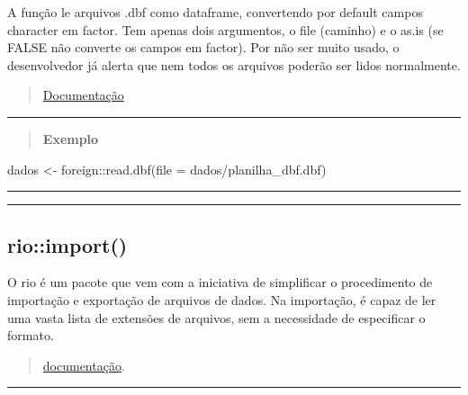 \documentclass[
]{book}
\newenvironment{Shaded}{\begin{snugshade}}{\end{snugshade}}
\newcommand{\AttributeTok}[1]{\textcolor[rgb]{0.77,0.63,0.00}{#1}}
\newcommand{\FunctionTok}[1]{\textcolor[rgb]{0.00,0.00,0.00}{#1}}
\newcommand{\NormalTok}[1]{#1}
\newcommand{\OtherTok}[1]{\textcolor[rgb]{0.56,0.35,0.01}{#1}}
\newcommand{\SpecialCharTok}[1]{\textcolor[rgb]{0.00,0.00,0.00}{#1}}
\newcommand{\StringTok}[1]{\textcolor[rgb]{0.31,0.60,0.02}{#1}}
\theoremstyle{definition}
\theoremstyle{definition}
\theoremstyle{definition}
\theoremstyle{definition}
\theoremstyle{remark}
\begin{document}
A função le arquivos .dbf como dataframe, convertendo por default campos character em factor. Tem apenas dois argumentos, o file (caminho) e o as.is (se FALSE não converte os campos em factor). Por não ser muito usado, o desenvolvedor já alerta que nem todos os arquivos poderão ser lidos normalmente.

\begin{quote}
\href{https://www.rdocumentation.org/packages/foreign/versions/0.8-82/topics/read.dbf}{Documentação}
\end{quote}

\begin{center}\rule{0.5\linewidth}{0.5pt}\end{center}

\begin{quote}
\textbf{Exemplo}
\end{quote}

\begin{Shaded}
\begin{Highlighting}[]
\NormalTok{dados }\OtherTok{\textless{}{-}}\NormalTok{ foreign}\SpecialCharTok{::}\FunctionTok{read.dbf}\NormalTok{(}\AttributeTok{file =} \StringTok{\textquotesingle{}dados/planilha\_dbf.dbf\textquotesingle{}}\NormalTok{)}
\end{Highlighting}
\end{Shaded}

\begin{center}\rule{0.5\linewidth}{0.5pt}\end{center}

\begin{center}\rule{0.5\linewidth}{0.5pt}\end{center}

\hypertarget{rioimport}{%
\subsection{rio::import()}\label{rioimport}}

O rio é um pacote que vem com a iniciativa de simplificar o procedimento de importação e exportação de arquivos de dados. Na importação, é capaz de ler uma vasta lista de extensões de arquivos, sem a necessidade de especificar o formato.

\begin{quote}
\href{https://www.rdocumentation.org/packages/rio/versions/0.5.29/topics/import}{documentação}.
\end{quote}

\begin{center}\rule{0.5\linewidth}{0.5pt}\end{center}
\end{document}
